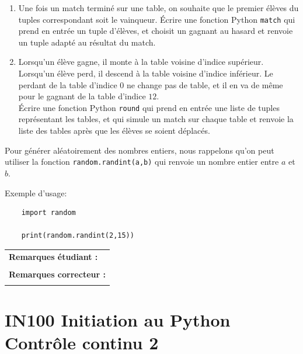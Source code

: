 \documentclass[a4paper,11pt]{article}
\begin{document}
\begin{enumerate}
  \item[1.] Une fois un match terminé sur une table, on souhaite que le premier élèves du tuples correspondant soit le vainqueur. Écrire une fonction Python \texttt{match} qui prend en entrée un tuple d'élèves, et choisit un gagnant au hasard et renvoie un tuple adapté au résultat du match.
  
  \item[2.] Lorsqu'un élève gagne, il monte à la table voisine d'indice supérieur. Lorsqu'un élève perd, il descend à la table voisine d'indice inférieur. Le perdant de la table d'indice $0$ ne change pas de table, et il en va de même pour le gagnant de la table d'indice $12$.\\   
  Écrire une fonction Python \texttt{round} qui prend en entrée une liste de tuples représentant les tables, et qui simule un match sur chaque table et renvoie la liste des tables après que les élèves se soient déplacés.
\end{enumerate}
 
Pour générer aléatoirement des nombres entiers, nous rappelons qu'on peut utiliser la fonction \texttt{random.randint(a,b)} qui renvoie un nombre entier entre $a$ et $b$. 

\vspace{0.2 cm}
Exemple d'usage:
\vspace{-0.2 cm}
\begin{verbatim}
	import random
	
	print(random.randint(2,15))
\end{verbatim}



\vspace{-0.4 cm}
\begin{table}[h!]
\centering
\renewcommand{\arraystretch}{1.4} %
\begin{tabular}{|p{15cm}|}
\hline
\textbf{Remarques étudiant :}    \\
 \\
\hline
\textbf{Remarques correcteur :}  \\
 \\
\hline
\end{tabular}
\end{table}


\section*{\center IN100 Initiation au Python\\
Contrôle continu 2}
\end{document}
